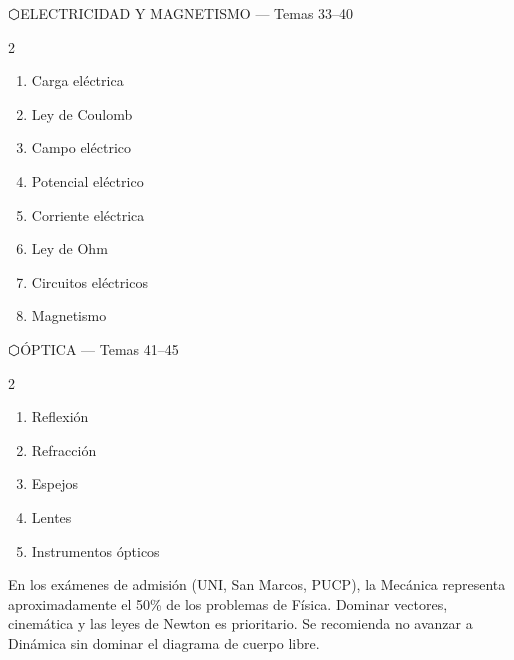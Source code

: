 \vspace{0.3cm}

\begin{tcolorbox}[enhanced, colback=AzulMedio, colframe=DoradoAcadémico,
    arc=3pt, boxrule=1pt, left=8pt, right=8pt, top=5pt, bottom=5pt,
    fontupper=\sffamily\bfseries\color{white}]
  ⬡\quad ELECTRICIDAD Y MAGNETISMO — Temas 33–40
\end{tcolorbox}
\begin{multicols}{2}
  \begin{enumerate}[label=\textcolor{AzulMedio}{\textbf{\arabic*.}},
      leftmargin=2em, itemsep=1pt, start=33]
    \item Carga eléctrica
    \item Ley de Coulomb
    \item Campo eléctrico
    \item Potencial eléctrico
    \item Corriente eléctrica
    \item Ley de Ohm
    \item Circuitos eléctricos
    \item Magnetismo
  \end{enumerate}
\end{multicols}

\vspace{0.3cm}

\begin{tcolorbox}[enhanced, colback=AzulPizarra!90, colframe=DoradoAcadémico,
    arc=3pt, boxrule=1pt, left=8pt, right=8pt, top=5pt, bottom=5pt,
    fontupper=\sffamily\bfseries\color{white}]
  ⬡\quad ÓPTICA — Temas 41–45
\end{tcolorbox}
\begin{multicols}{2}
  \begin{enumerate}[label=\textcolor{AzulPizarra}{\textbf{\arabic*.}},
      leftmargin=2em, itemsep=1pt, start=41]
    \item Reflexión
    \item Refracción
    \item Espejos
    \item Lentes
    \item Instrumentos ópticos
  \end{enumerate}
\end{multicols}

\vspace{0.5cm}

\begin{cajatip}
  En los exámenes de admisión (UNI, San Marcos, PUCP), la Mecánica representa
  aproximadamente el 50\% de los problemas de Física. Dominar vectores,
  cinemática y las leyes de Newton es prioritario. Se recomienda no avanzar
  a Dinámica sin dominar el diagrama de cuerpo libre.
\end{cajatip}

\newpage